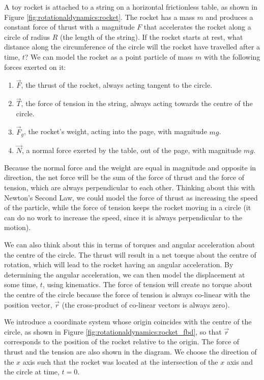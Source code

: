 \begin{example}{ A toy rocket is attached to a string on a horizontal frictionless table, as shown in Figure \ref{fig:rotationaldynamics:rocket}. The rocket has a mass $m$ and produces a constant force of thrust with a magnitude $F$ that accelerates the rocket along a circle of radius $R$ (the length of the string). If the rocket starts at rest, what distance along the circumference of the circle will the rocket have travelled after a time, $t$?}
We can model the rocket as a point particle of mass $m$ with the following forces exerted on it:
\begin{enumerate}
\item $\vec F$, the thrust of the rocket, always acting tangent to the circle.
\item $\vec T$, the force of tension in the string, always acting towards the centre of the circle.
\item $\vec F_g$, the rocket's weight, acting into the page, with magnitude $mg$.
\item $\vec N$, a normal force exerted by the table, out of the page, with magnitude $mg$.
\end{enumerate}
Because the normal force and the weight are equal in magnitude and opposite in direction, the net force will be the sum of the force of thrust and the force of tension, which are always perpendicular to each other. Thinking about this with Newton's Second Law, we could model the force of thrust as increasing the speed of the particle, while the force of tension keeps the rocket moving in a circle (it can do no work to increase the speed, since it is always perpendicular to the motion).

We can also think about this in terms of torques and angular acceleration about the centre of the circle. The thrust will result in a net torque about the centre of rotation, which will lead to the rocket having an angular acceleration. By determining the angular acceleration, we can then model the displacement at some time, $t$, using kinematics. The force of tension will create no torque about the centre of the circle because the force of tension is always co-linear with the position vector, $\vec r$ (the cross-product of co-linear vectors is always zero).

We introduce a coordinate system whose origin coincides with the centre of the circle, as shown in Figure \ref{fig:rotationaldynamics:rocket_fbd}, so that $\vec r$ corresponds to the position of the rocket relative to the origin.  The force of thrust and the tension are also shown in the diagram. We choose the direction of the $x$ axis such that the rocket was located at the intersection of the $x$ axis and the circle at time, $t=0$.


\end{example}
